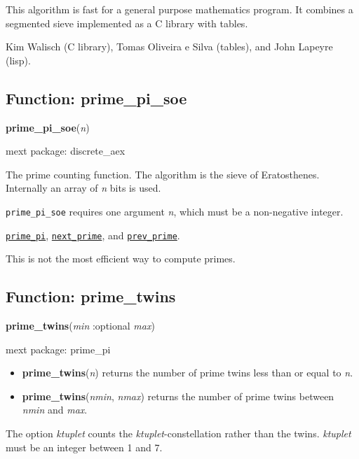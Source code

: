\documentclass[]{article}
\begin{document}
This algorithm is fast for a general purpose mathematics program. It combines a segmented sieve implemented as a C library with tables. 

\vspace{5 pt}


 Kim Walisch (C library), Tomas Oliveira e Silva (tables), and John Lapeyre (lisp).

\vspace{5 pt}


\subsection{Function: prime\_pi\_soe\label{sec:prime_pi_soe}}
\hypertarget{prime_pi_soe}{}
{\bf prime\_pi\_soe}({\it n})


\noindent mext package: discrete\_aex



\vspace{5 pt}
The prime counting function. The algorithm is the sieve of Eratosthenes. Internally an array of {\it n} bits is used. 

\vspace{5 pt}

   {\tt prime\_pi\_soe} requires one argument {\it n}, which must be a non-negative integer.


\vspace{5 pt}


  \hyperlink{prime_pi}{{\tt prime\_pi}}, \hyperlink{next_prime}{{\tt next\_prime}}, and \hyperlink{prev_prime}{{\tt prev\_prime}}.

\vspace{5 pt}


This is not the most efficient way to compute primes. 

\vspace{5 pt}


\subsection{Function: prime\_twins\label{sec:prime_twins}}
\hypertarget{prime_twins}{}
{\bf prime\_twins}({\it min} :optional {\it max})


\noindent mext package: prime\_pi



\vspace{5 pt}
\begin{itemize}
\item[] {\bf prime\_twins}({\it n})
  returns the number of prime twins less than or equal to {\it n}. 

\item[] {\bf prime\_twins}({\it nmin}, {\it nmax})
  returns the number of prime twins between {\it nmin} and {\it max}. 

\end{itemize}
The option {\it ktuplet} counts the {\it ktuplet}-constellation rather than the twins. {\it ktuplet} must be an integer between 1 and 7. 
\end{document}
